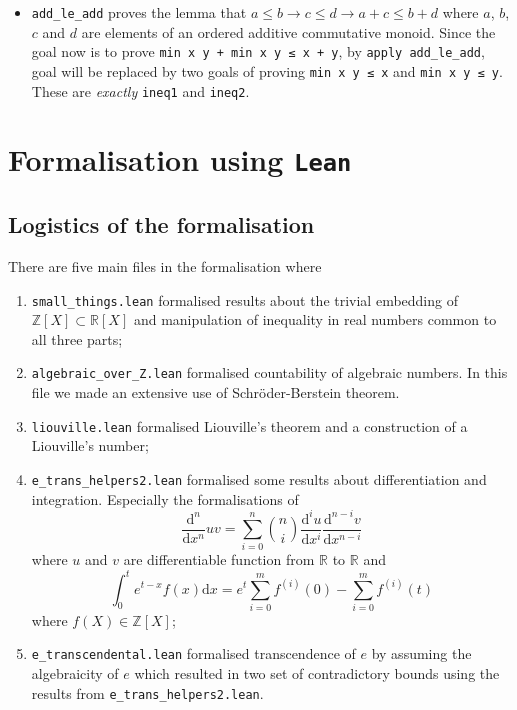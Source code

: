 \documentclass{report}
\theoremstyle{definition}
\theoremstyle{plain}
\begin{document}
\begin{itemize}
  \item {\tt add\_le\_add} proves the lemma that $a \le b \to c \le d \to a + c \le b + d$ where $a$, $b$, $c$ and $d$ are elements of an ordered additive commutative monoid. Since the goal now is to prove {\tt min x y + min x y ≤ x + y}, by {\tt apply add\_le\_add}, goal will be replaced by two goals of proving {\tt min x y ≤ x} and {\tt min x y ≤ y}. These are {\it exactly} {\tt ineq1} and {\tt ineq2}.
\end{itemize}

\chapter{Formalisation using {\tt Lean}}\label{fmlsn}


\section*{Logistics of the formalisation}
There are five main files in the formalisation where 
\begin{enumerate}
\item {\tt small\_things.lean} formalised results about the trivial embedding of $\mathbb Z[X]\subset \mathbb R[X]$ and manipulation of inequality in real numbers common to all three parts;
\item {\tt algebraic\_over\_Z.lean} formalised countability of algebraic numbers. In this file we made an extensive use of Schröder-Berstein theorem.
\item {\tt liouville.lean} formalised Liouville's theorem and a construction of a Liouville's number;
\item {\tt e\_trans\_helpers2.lean} formalised some results about differentiation and integration. Especially the formalisations of 
$$
\frac{\mathrm d^n}{\mathrm d x^n}uv = \sum_{i=0}^n{n \choose i}\frac{\mathrm d^i u}{\mathrm d x^i}\frac{\mathrm d^{n-i} v}{\mathrm d x^{n-i}}
$$ where $u$ and $v$ are differentiable function from $\mathbb R$ to $\mathbb R$ and
$$
\int_0^t e^{t-x}f(x)\mathrm{d}x=e^t\sum_{i=0}^m f^{(i)}(0)-\sum_{i=0}^m f^{(i)}(t)
$$ where $f(X)\in\mathbb Z[X]$;
\item {\tt e\_transcendental.lean} formalised transcendence of $e$ by assuming the algebraicity of $e$ which resulted in two set of contradictory bounds using the results from {\tt e\_trans\_helpers2.lean}.
\end{enumerate}
\end{document}

